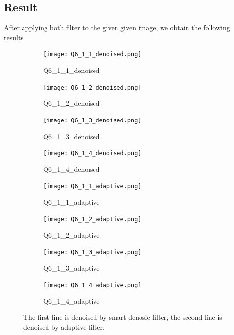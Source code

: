 \documentclass[
	12pt, %
]{style/fphw}
\begin{document}
	\subsection*{Result}
	
	After applying both filter to the given given image, we obtain the following results

	\begin{figure}[H]
		\centering
		\begin{subfigure}[b]{.24\textwidth}
			\centering
			\texttt{[image: Q6\_1\_1\_denoised.png]}
			\caption{Q6\_1\_1\_denoised}
			\label{Q6_1_1_denoised}
		\end{subfigure}
		\hfill
		\begin{subfigure}[b]{.24\textwidth}
			\centering
			\texttt{[image: Q6\_1\_2\_denoised.png]}
			\caption{Q6\_1\_2\_denoised}
			\label{Q6_1_2_denoised}
		\end{subfigure}
		\hfill
		\begin{subfigure}[b]{.24\textwidth}
			\centering
			\texttt{[image: Q6\_1\_3\_denoised.png]}
			\caption{Q6\_1\_3\_denoised}
			\label{Q6_1_3_denoised}
		\end{subfigure}
		\hfill
		\begin{subfigure}[b]{.24\textwidth}
			\centering
			\texttt{[image: Q6\_1\_4\_denoised.png]}
			\caption{Q6\_1\_4\_denoised}
			\label{Q6_1_4_denoised}
		\end{subfigure}
		\vfill
		\begin{subfigure}[b]{.24\textwidth}
			\centering
			\texttt{[image: Q6\_1\_1\_adaptive.png]}
			\caption{Q6\_1\_1\_adaptive}
			\label{Q6_1_1_adaptive}
		\end{subfigure}
		\hfill
		\begin{subfigure}[b]{.24\textwidth}
			\centering
			\texttt{[image: Q6\_1\_2\_adaptive.png]}
			\caption{Q6\_1\_2\_adaptive}
			\label{Q6_1_2_adaptive}
		\end{subfigure}
		\hfill
		\begin{subfigure}[b]{.24\textwidth}
			\centering
			\texttt{[image: Q6\_1\_3\_adaptive.png]}
			\caption{Q6\_1\_3\_adaptive}
			\label{Q6_1_3_adaptive}
		\end{subfigure}
		\hfill
		\begin{subfigure}[b]{.24\textwidth}
			\centering
			\texttt{[image: Q6\_1\_4\_adaptive.png]}
			\caption{Q6\_1\_4\_adaptive}
			\label{Q6_1_4_adaptive}
		\end{subfigure}
		\caption{The first line is denoised by smart denosie filter, the second line is denoised by adaptive filter.}
    	\label{Task I, result}	
	\end{figure}
\end{document}
